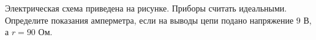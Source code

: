
Электрическая схема приведена на рисунке. Приборы считать идеальными. Определите показания амперметра, 
если на выводы цепи подано напряжение $ 9 $ В, \linebreak а $ r=90 $ Ом.



